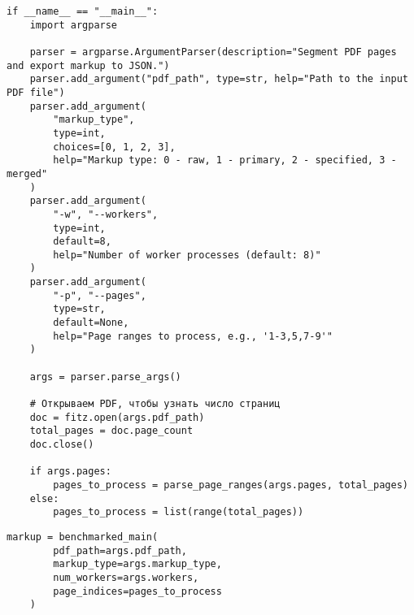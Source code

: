 \newpage

\begin{lstlisting}[caption={Скрипт, используемый в исследовании (часть 4)}, label={lst:}]
if __name__ == "__main__":
    import argparse

    parser = argparse.ArgumentParser(description="Segment PDF pages and export markup to JSON.")
    parser.add_argument("pdf_path", type=str, help="Path to the input PDF file")
    parser.add_argument(
        "markup_type",
        type=int,
        choices=[0, 1, 2, 3],
        help="Markup type: 0 - raw, 1 - primary, 2 - specified, 3 - merged"
    )
    parser.add_argument(
        "-w", "--workers",
        type=int,
        default=8,
        help="Number of worker processes (default: 8)"
    )
    parser.add_argument(
        "-p", "--pages",
        type=str,
        default=None,
        help="Page ranges to process, e.g., '1-3,5,7-9'"
    )

    args = parser.parse_args()

    # Открываем PDF, чтобы узнать число страниц
    doc = fitz.open(args.pdf_path)
    total_pages = doc.page_count
    doc.close()

    if args.pages:
        pages_to_process = parse_page_ranges(args.pages, total_pages)
    else:
        pages_to_process = list(range(total_pages))
\end{lstlisting}

\newpage

\begin{lstlisting}[caption={Скрипт, используемый в исследовании (часть 5)}, label={lst:mbf}]
    markup = benchmarked_main(
        pdf_path=args.pdf_path,
        markup_type=args.markup_type,
        num_workers=args.workers,
        page_indices=pages_to_process
    )
\end{lstlisting}
